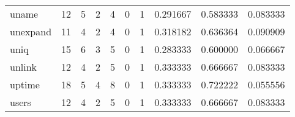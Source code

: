 \begin{tabular}{lrrrrrrrrr}
uname     &                                      12 &                                                  5 &                                                  2 &                                                  4 &                                                  0 &                                                  1 &                                           0.291667 &                               0.583333 &                             0.083333 \\
unexpand  &                                      11 &                                                  4 &                                                  2 &                                                  4 &                                                  0 &                                                  1 &                                           0.318182 &                               0.636364 &                             0.090909 \\
uniq      &                                      15 &                                                  6 &                                                  3 &                                                  5 &                                                  0 &                                                  1 &                                           0.283333 &                               0.600000 &                             0.066667 \\
unlink    &                                      12 &                                                  4 &                                                  2 &                                                  5 &                                                  0 &                                                  1 &                                           0.333333 &                               0.666667 &                             0.083333 \\
uptime    &                                      18 &                                                  5 &                                                  4 &                                                  8 &                                                  0 &                                                  1 &                                           0.333333 &                               0.722222 &                             0.055556 \\
users     &                                      12 &                                                  4 &                                                  2 &                                                  5 &                                                  0 &                                                  1 &                                           0.333333 &                               0.666667 &                             0.083333 \\

\end{tabular}
